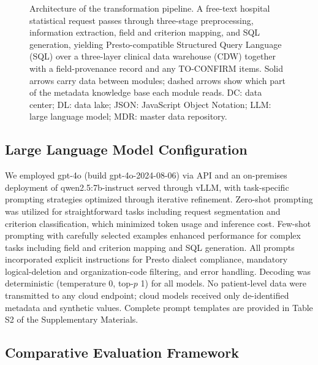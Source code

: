 \documentclass[applsci,article,submit,pdftex,oneauthor]{Definitions/mdpi}
\begin{document}
\begin{figure}[H]
\caption{Architecture of the transformation pipeline. A free-text hospital
statistical request passes through three-stage preprocessing, information
extraction, field and criterion mapping, and SQL generation, yielding
Presto-compatible Structured Query Language (SQL) over a three-layer clinical
data warehouse (CDW) together with a field-provenance record and any
TO-CONFIRM items. Solid arrows carry data between modules; dashed arrows
show which part of the metadata knowledge base each module reads. DC: data
center; DL: data lake; JSON: JavaScript Object Notation; LLM: large language
model; MDR: master data repository.}
\label{fig:arch}
\end{figure}

\subsection{Large Language Model Configuration}
We employed gpt-4o (build gpt-4o-2024-08-06) via API and an on-premises deployment of
qwen2.5:7b-instruct served through vLLM, with task-specific prompting strategies
optimized through iterative refinement. Zero-shot prompting was utilized for
straightforward tasks including request segmentation and criterion
classification, which minimized token usage and inference cost. Few-shot
prompting with carefully selected examples enhanced performance for complex
tasks including field and criterion mapping and SQL generation. All prompts
incorporated explicit instructions for Presto dialect compliance, mandatory
logical-deletion and organization-code filtering, and error handling. Decoding
was deterministic (temperature 0, top-$p$ 1) for all models. No patient-level
data were transmitted to any cloud endpoint; cloud models received only
de-identified metadata and synthetic values. Complete prompt templates are
provided in Table S2 of the Supplementary Materials.

\subsection{Comparative Evaluation Framework}
\end{document}

